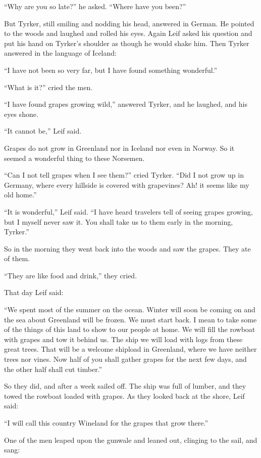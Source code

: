 ``Why are you so late?'' he asked. ``Where have you been?''

But Tyrker, still smiling and nodding his head, answered in German. He
pointed to the woods and laughed and rolled his eyes. Again Leif asked
his question and put his hand on Tyrker's shoulder as though he would
shake him. Then Tyrker answered in the language of Iceland:

``I have not been so very far, but I have found something wonderful.''

``What is it?'' cried the men.

``I have found grapes growing wild,'' answered Tyrker, and he laughed,
and his eyes shone.

``It cannot be,'' Leif said.

Grapes do not grow in Greenland nor in Iceland nor even in Norway. So it
seemed a wonderful thing to these Norsemen.

``Can I not tell grapes when I see them?'' cried Tyrker. ``Did I not
grow up in Germany, where every hillside is covered with grapevines? Ah!
it seems like my old home.''

``It is wonderful,'' Leif said. ``I have heard travelers tell of seeing
grapes growing, but I myself never saw it. You shall take us to them
early in the morning, Tyrker.''

So in the morning they went back into the woods and saw the grapes. They
ate of them.

``They are like food and drink,'' they cried.

That day Leif said:

``We spent most of the summer on the ocean. Winter will soon be coming
on and the sea about Greenland will be frozen. We must start back. I
mean to take some of the things of this land to show to our people at
home. We will fill the rowboat with grapes and tow it behind us. The
ship we will load with logs from these great trees. That will be a
welcome shipload in Greenland, where we have neither trees nor vines.
Now half of you shall gather grapes for the next few days, and the other
half shall cut timber.''

So they did, and after a week sailed off. The ship was full of lumber,
and they towed the rowboat loaded with grapes. As they looked back at
the shore, Leif said:

``I will call this country Wineland for the grapes that grow there.''

One of the men leaped upon the gunwale and leaned out, clinging to the
sail, and sang:

